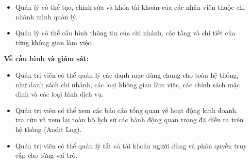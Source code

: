 \begin{itemize}
    \item Quản lý có thể tạo, chỉnh sửa và khóa tài khoản của các nhân viên thuộc chi nhánh mình quản lý.
    \item Quản lý có thể cấu hình thông tin của chi nhánh, các tầng và chi tiết của từng không gian làm việc.
\end{itemize}


\textbf{Về cấu hình và giám sát:}

\begin{itemize}
    \item Quản trị viên có thể quản lý các danh mục dùng chung cho toàn hệ thống, như danh sách chi nhánh, các loại không gian làm việc, các chính sách mặc định và các loại hình dịch vụ.
    \item Quản trị viên có thể xem các báo cáo tổng quan về hoạt động kinh doanh, tra cứu và xem lại toàn bộ lịch sử các hành động quan trọng đã diễn ra trên hệ thống (Audit Log).
    \item Quản trị viên có thể quản lý tất cả tài khoản người dùng và phân quyền truy cập cho từng vai trò.
\end{itemize}

